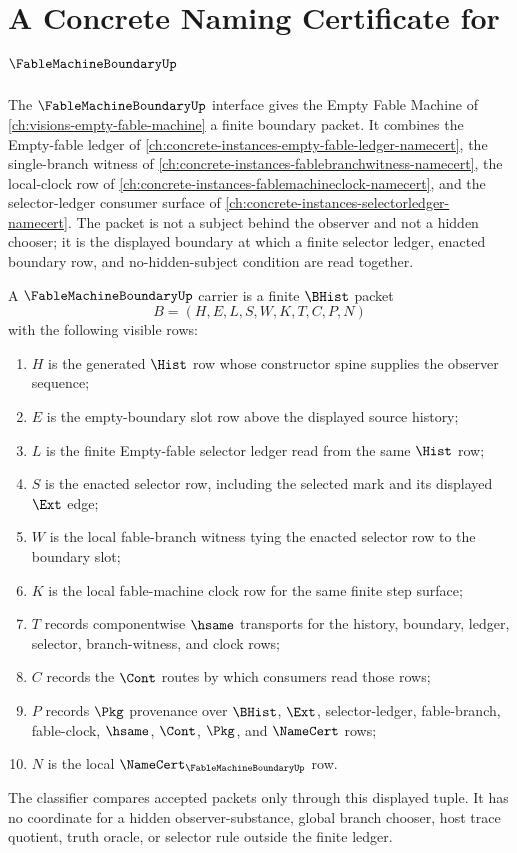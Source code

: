 \chapter{A Concrete Naming Certificate for $\FableMachineBoundaryUp$}
\label{ch:concrete-instances-fable-machine-boundary-namecert}

The $\FableMachineBoundaryUp$ interface gives the Empty Fable Machine of \autoref{ch:visions-empty-fable-machine} a finite boundary packet. It combines the Empty-fable ledger of \autoref{ch:concrete-instances-empty-fable-ledger-namecert}, the single-branch witness of \autoref{ch:concrete-instances-fablebranchwitness-namecert}, the local-clock row of \autoref{ch:concrete-instances-fablemachineclock-namecert}, and the selector-ledger consumer surface of \autoref{ch:concrete-instances-selectorledger-namecert}. The packet is not a subject behind the observer and not a hidden chooser; it is the displayed boundary at which a finite selector ledger, enacted boundary row, and no-hidden-subject condition are read together.

\begin{definition}
\label{def:fable-machine-boundary-carrier}
A $\FableMachineBoundaryUp$ carrier is a finite $\BHist$ packet
$$
B=(H,E,L,S,W,K,T,C,P,N)
$$
with the following visible rows:
\begin{enumerate}
\item $H$ is the generated $\Hist$ row whose constructor spine supplies the observer sequence;
\item $E$ is the empty-boundary slot row above the displayed source history;
\item $L$ is the finite Empty-fable selector ledger read from the same $\Hist$ row;
\item $S$ is the enacted selector row, including the selected mark and its displayed $\Ext$ edge;
\item $W$ is the local fable-branch witness tying the enacted selector row to the boundary slot;
\item $K$ is the local fable-machine clock row for the same finite step surface;
\item $T$ records componentwise $\hsame$ transports for the history, boundary, ledger, selector, branch-witness, and clock rows;
\item $C$ records the $\Cont$ routes by which consumers read those rows;
\item $P$ records $\Pkg$ provenance over $\BHist$, $\Ext$, selector-ledger, fable-branch, fable-clock, $\hsame$, $\Cont$, $\Pkg$, and $\NameCert$ rows;
\item $N$ is the local $\NameCert_{\FableMachineBoundaryUp}$ row.
\end{enumerate}
The classifier compares accepted packets only through this displayed tuple. It has no coordinate for a hidden observer-substance, global branch chooser, host trace quotient, truth oracle, or selector rule outside the finite ledger.
\end{definition}

